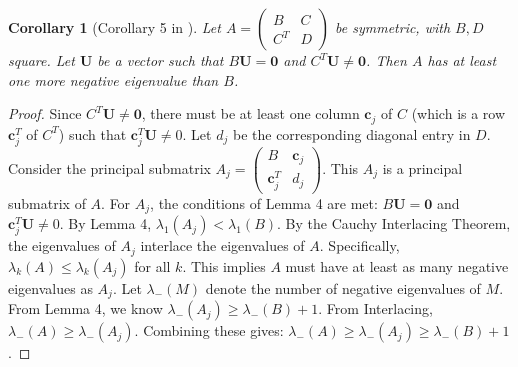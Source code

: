 \documentclass[12pt,a4paper]{report}
\theoremstyle{plain}
\newtheorem{corollary}[theorem]{Corollary}
\theoremstyle{definition}
\theoremstyle{remark}
\begin{document}
\begin{corollary}[Corollary 5 in \cite{main_paper}]
Let $A = \begin{pmatrix} B & C \\ C^T & D \end{pmatrix}$ be symmetric, with $B, D$ square. Let $\bm{U}$ be a vector such that $B\bm{U} = \bm{0}$ and $C^T\bm{U} \ne \bm{0}$. Then $A$ has at least one more negative eigenvalue than $B$.
\end{corollary}
\begin{proof}
Since $C^T\bm{U} \ne \bm{0}$, there must be at least one column $\bm{c}_j$ of $C$ (which is a row $\bm{c}_j^T$ of $C^T$) such that $\bm{c}_j^T \bm{U} \ne 0$.
Let $d_j$ be the corresponding diagonal entry in $D$.
Consider the principal submatrix $A_j = \begin{pmatrix} B & \bm{c}_j \\ \bm{c}_j^T & d_j \end{pmatrix}$.
This $A_j$ is a principal submatrix of $A$.
For $A_j$, the conditions of Lemma 4 are met: $B\bm{U} = \bm{0}$ and $\bm{c}_j^T \bm{U} \ne 0$.
By Lemma 4, $\lambda_1(A_j) < \lambda_1(B)$.
By the Cauchy Interlacing Theorem, the eigenvalues of $A_j$ interlace the eigenvalues of $A$. Specifically, $\lambda_k(A) \le \lambda_k(A_j)$ for all $k$.
This implies $A$ must have at least as many negative eigenvalues as $A_j$.
Let $\lambda_-(M)$ denote the number of negative eigenvalues of $M$.
From Lemma 4, we know $\lambda_-(A_j) \ge \lambda_-(B) + 1$.
From Interlacing, $\lambda_-(A) \ge \lambda_-(A_j)$.
Combining these gives: $\lambda_-(A) \ge \lambda_-(A_j) \ge \lambda_-(B) + 1$.
\end{proof}
\end{document}
